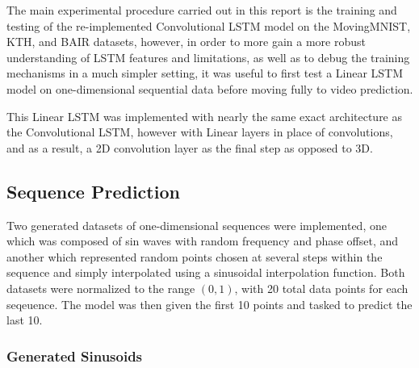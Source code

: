 \documentclass{scrartcl}
\begin{document}


The main experimental procedure carried out in this report is the training and
testing of the re-implemented Convolutional LSTM model on the MovingMNIST, KTH,
and BAIR datasets, however, in order to more gain a more robust understanding
of LSTM features and limitations, as well as to debug the training mechanisms
in a much simpler setting, it was useful to first test a Linear LSTM model on
one-dimensional sequential data before moving fully to video prediction.

This Linear LSTM was implemented with nearly the same exact architecture as the
Convolutional LSTM, however with Linear layers in place of convolutions, and as
a result, a 2D convolution layer as the final step as opposed to 3D.


\subsection{Sequence Prediction}
\label{subsec:experiment_sp}

Two generated datasets of one-dimensional sequences were implemented, one which
was composed of sin waves with random frequency and phase offset, and another
which represented random points chosen at several steps within the sequence and
simply interpolated using a sinusoidal interpolation function. Both datasets
were normalized to the range $(0, 1)$, with 20 total data points for each
seqeuence. The model was then given the first 10 points and tasked to predict
the last 10.

\subsubsection{Generated Sinusoids}
\label{subsubsec:generated_sins}
\end{document}
